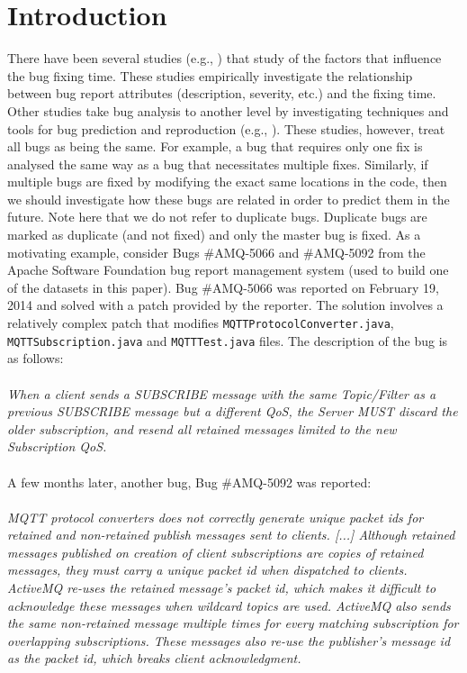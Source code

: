 
\section{Introduction}


There have been several studies (e.g., \cite{Weiß2007, Zhang2013}) that study of the factors that influence the bug fixing time.
These studies empirically investigate the relationship between bug report attributes (description, severity, etc.) and the fixing time.
Other studies take bug analysis to another level by investigating techniques and tools for bug prediction and reproduction (e.g., \cite{Chen2013, Kim2007a, Nayrolles2015}).
These studies, however, treat all bugs as being the same.
For example, a bug that requires only one fix is analysed the same way as a bug that necessitates multiple fixes.
Similarly, if multiple bugs are fixed by modifying the exact same locations in the code, then we should investigate how these bugs are related in order to predict them in the future.
Note here that we do not refer to duplicate bugs.
Duplicate bugs are marked as duplicate (and not fixed) and only the master bug is fixed.
As a motivating example, consider Bugs \#AMQ-5066 and \#AMQ-5092 from the Apache Software Foundation bug report management system (used to build one of the datasets in this paper).
Bug \#AMQ-5066 was reported on February 19, 2014 and solved with a patch provided by the reporter.
The solution involves a relatively complex patch that modifies {\tt MQTTProtocolConverter.java}, {\tt MQTTSubscription.java} and {\tt MQTTTest.java} files.
The description of the bug is as follows:
\\ \\
{\it When a client sends a SUBSCRIBE message with the same Topic/Filter as a previous SUBSCRIBE message but a different QoS, the Server MUST discard the older subscription, and resend all retained messages limited to the new Subscription QoS.}
\\ \\
A few months later, another bug, Bug \#AMQ-5092 was reported:
\\ \\
{\it MQTT protocol converters does not correctly generate unique packet ids for retained and non-retained publish messages sent to clients.
[...] Although retained messages published on creation of client subscriptions are copies of retained messages, they must carry a unique packet id when dispatched to clients.
ActiveMQ re-uses the retained message's packet id, which makes it difficult to  acknowledge these messages when wildcard topics are used.
ActiveMQ also sends the same non-retained message multiple times for every matching subscription for overlapping subscriptions.
These messages also re-use the publisher's message id as the packet id, which breaks client acknowledgment.}
